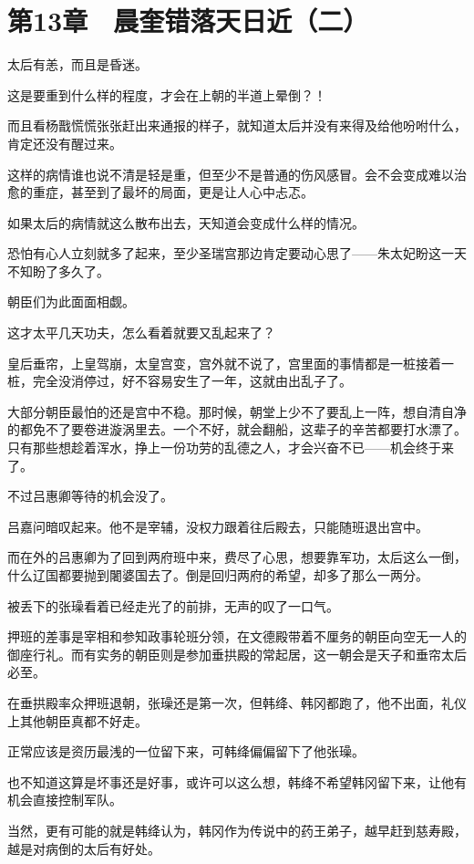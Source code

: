 \section{第13章　晨奎错落天日近（二）}

 太后有恙，而且是昏迷。

这是要重到什么样的程度，才会在上朝的半道上晕倒？！

而且看杨戬慌慌张张赶出来通报的样子，就知道太后并没有来得及给他吩咐什么，肯定还没有醒过来。

这样的病情谁也说不清是轻是重，但至少不是普通的伤风感冒。会不会变成难以治愈的重症，甚至到了最坏的局面，更是让人心中忐忑。

如果太后的病情就这么散布出去，天知道会变成什么样的情况。

恐怕有心人立刻就多了起来，至少圣瑞宫那边肯定要动心思了——朱太妃盼这一天不知盼了多久了。

朝臣们为此面面相觑。

这才太平几天功夫，怎么看着就要又乱起来了？

皇后垂帘，上皇驾崩，太皇宫变，宫外就不说了，宫里面的事情都是一桩接着一桩，完全没消停过，好不容易安生了一年，这就由出乱子了。

大部分朝臣最怕的还是宫中不稳。那时候，朝堂上少不了要乱上一阵，想自清自净的都免不了要卷进漩涡里去。一个不好，就会翻船，这辈子的辛苦都要打水漂了。只有那些想趁着浑水，挣上一份功劳的乱德之人，才会兴奋不已——机会终于来了。

不过吕惠卿等待的机会没了。

吕嘉问暗叹起来。他不是宰辅，没权力跟着往后殿去，只能随班退出宫中。

而在外的吕惠卿为了回到两府班中来，费尽了心思，想要靠军功，太后这么一倒，什么辽国都要抛到闍婆国去了。倒是回归两府的希望，却多了那么一两分。

被丢下的张璪看着已经走光了的前排，无声的叹了一口气。

押班的差事是宰相和参知政事轮班分领，在文德殿带着不厘务的朝臣向空无一人的御座行礼。而有实务的朝臣则是参加垂拱殿的常起居，这一朝会是天子和垂帘太后必至。

在垂拱殿率众押班退朝，张璪还是第一次，但韩绛、韩冈都跑了，他不出面，礼仪上其他朝臣真都不好走。

正常应该是资历最浅的一位留下来，可韩绛偏偏留下了他张璪。

也不知道这算是坏事还是好事，或许可以这么想，韩绛不希望韩冈留下来，让他有机会直接控制军队。

当然，更有可能的就是韩绛认为，韩冈作为传说中的药王弟子，越早赶到慈寿殿，越是对病倒的太后有好处。

